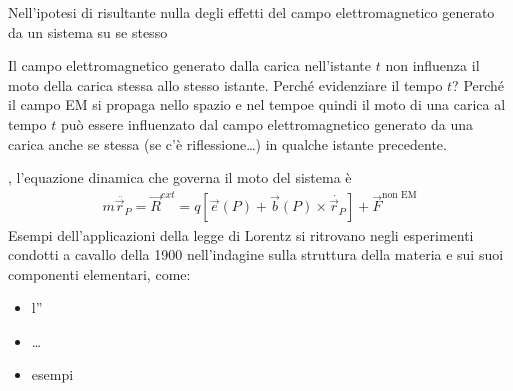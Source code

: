 \documentclass[letterpaper,10pt,italian]{jupyterBook}
\begin{document}
\sphinxAtStartPar
Nell’ipotesi di risultante nulla degli effetti del campo elettromagnetico generato da un sistema su se stesso%
\begin{footnote}[2]\sphinxAtStartFootnote
Il campo elettromagnetico generato dalla carica nell’istante \(t\) non influenza il moto della carica stessa allo stesso istante. Perché evidenziare il tempo \(t\)? Perché il campo EM si propaga nello spazio e nel tempoe quindi il moto di una carica al tempo \(t\) può essere influenzato dal campo elettromagnetico generato da una carica \sphinxhyphen{} anche se stessa (se c’è riflessione…) \sphinxhyphen{} in qualche istante precedente.
%
\end{footnote}, l’equazione dinamica che governa il moto del sistema è
\begin{equation*}
\begin{split}m \ddot{ \vec{r}_P } = \vec{R}^{ext} = q \left[ \vec{e}(P) + \vec{b}(P) \times \dot{\vec{r}_P} \right] + \vec{F}^{\text{non EM}}\end{split}
\end{equation*}
\sphinxAtStartPar
Esempi dell’applicazioni della legge di Lorentz si ritrovano negli esperimenti condotti a cavallo della 1900 nell’indagine sulla struttura della materia e sui suoi componenti elementari, come:
\begin{itemize}
\item {} 
\sphinxAtStartPar
l”{\hyperref[\detokenize{ch/modern/experiments:modern-experiments-thomson-electron}]{}}

\item {} 
\sphinxAtStartPar
…

\item {} 
\sphinxAtStartPar
{} esempi

\end{itemize}
\end{document}
